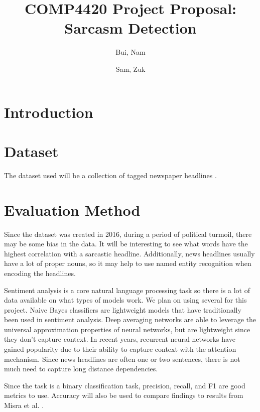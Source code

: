 \documentclass[11pt]{article}
\title{COMP4420 Project Proposal: Sarcasm Detection}
\author{
    Bui, Nam \\
    \email{nam\_bui@student.uml.edu}
    \and
    Sam, Zuk \\
    \email {samuel\_zuk@student.uml.edu}
}
\begin{document}
\maketitle

\section{Introduction}



\section{Dataset}

The dataset used will be a collection of
tagged newspaper headlines \cite{misra2023Sarcasm}.



\section{Evaluation Method}

Since the dataset was created in 2016,
during a period of political turmoil,
there may be some bias in the data.
It will be interesting to see what words
have the highest correlation with a sarcastic headline.
Additionally, news headlines usually have a lot of proper nouns,
so it may help to use named entity recognition when encoding the headlines.

Sentiment analysis is a core natural language processing task
so there is a lot of data available on what types of models work.
We plan on using several for this project.
Naive Bayes classifiers are lightweight models that have
traditionally been used in sentiment analysis.
Deep averaging networks are able to leverage the universal approximation properties
of neural networks, but are lightweight since they don't capture context.
In recent years, recurrent neural networks have gained popularity
due to their ability to capture context with the attention mechanism.
Since news headlines are often one or two sentences,
there is not much need to capture long distance dependencies.

Since the task is a binary classification task,
precision, recall, and F1 are good metrics to use.
Accuracy will also be used to compare findings
to results from Misra et al. \cite{misra2023Sarcasm}.

\printbibliography
\end{document}
